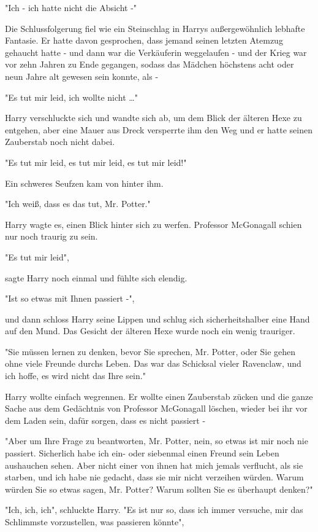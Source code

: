 {"Ich - ich hatte nicht die Absicht -"

Die Schlussfolgerung fiel wie ein Steinschlag in Harrys außergewöhnlich lebhafte Fantasie. Er hatte davon gesprochen, dass jemand seinen letzten Atemzug gehaucht hatte - und dann war die Verkäuferin weggelaufen - und der Krieg war vor zehn Jahren zu Ende gegangen, sodass das Mädchen höchstens acht oder neun Jahre alt gewesen sein konnte, als -

"Es tut mir leid, ich wollte nicht …"

Harry verschluckte sich und wandte sich ab, um dem Blick der älteren Hexe zu entgehen, aber eine Mauer aus Dreck versperrte ihm den Weg und er hatte seinen Zauberstab noch nicht dabei.

"Es tut mir leid, es tut mir leid, es tut mir leid!"

Ein schweres Seufzen kam von hinter ihm.

"Ich weiß, dass es das tut, Mr. Potter."

Harry wagte es, einen Blick hinter sich zu werfen. Professor McGonagall schien nur noch traurig zu sein.

"Es tut mir leid",

sagte Harry noch einmal und fühlte sich elendig.

"Ist so etwas mit Ihnen passiert -",

und dann schloss Harry seine Lippen und schlug sich sicherheitshalber eine Hand auf den Mund. Das Gesicht der älteren Hexe wurde noch ein wenig trauriger.

"Sie müssen lernen zu denken, bevor Sie sprechen, Mr. Potter, oder Sie gehen ohne viele Freunde durchs Leben. Das war das Schicksal vieler Ravenclaw, und ich hoffe, es wird nicht das Ihre sein."

Harry wollte einfach wegrennen. Er wollte einen Zauberstab zücken und die ganze Sache aus dem Gedächtnis von Professor McGonagall löschen, wieder bei ihr vor dem Laden sein, dafür sorgen, dass es nicht passiert -

"Aber um Ihre Frage zu beantworten, Mr. Potter, nein, so etwas ist mir noch nie passiert. Sicherlich habe ich ein- oder siebenmal einen Freund sein Leben aushauchen sehen. Aber nicht einer von ihnen hat mich jemals verflucht, als sie starben, und ich habe nie gedacht, dass sie mir nicht verzeihen würden. Warum würden Sie so etwas sagen, Mr. Potter? Warum sollten Sie es überhaupt denken?"

"Ich, ich, ich", schluckte Harry. "Es ist nur so, dass ich immer versuche, mir das Schlimmste vorzustellen, was passieren könnte",

}
